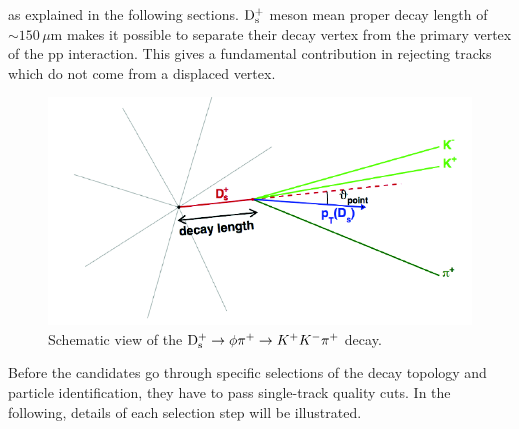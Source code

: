    as explained in the following sections. 
${\rm D_s^+}$ meson mean proper decay length of $\sim 150\, \mu$m  
makes it possible to separate their decay vertex from the primary vertex
of the pp interaction. 
This gives a fundamental contribution in rejecting tracks which do not come from a displaced vertex.
\begin{figure}[!t]
\centering
\includegraphics[width=12cm]{FigCap4/Ds.png}
\caption{Schematic view of the ${\rm D_s^+}\rightarrow \phi \pi^+ \rightarrow K^+K^-\pi^+$ decay.}
\label{fig:DsDecayTopology}
\end{figure}
Before the candidates go through specific selections of the decay
topology and particle identification, they have to pass single-track 
quality cuts. In the following, details of each selection step will
be illustrated. 



